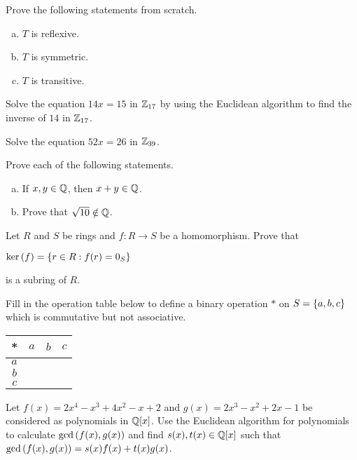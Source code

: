 \documentclass[11pt]{exam}
\begin{document}
\begin{questions}
Prove the following statements from scratch.
\begin{enumerate}[(a)]
\item $T$ is reflexive.
\vfill

\item $T$ is symmetric.
\vfill

\item $T$ is transitive.
\vfill

\end{enumerate}
\newpage

\question[3] Solve the equation $14x = 15$ in $\mathbb{Z}_{17}$ by using the Euclidean algorithm to find the inverse of $14$ in $\mathbb{Z}_{17}$.
\vfill

\question[3] Solve the equation $52x = 26$ in $\mathbb{Z}_{39}$.
\vfill

\newpage

\question[5] Prove each of the following statements.
\begin{enumerate}[(a)]
\item If $x,y\in\mathbb{Q}$, then $x+y\in\mathbb{Q}$.
\vfill

\item Prove that $\sqrt{10}\notin\mathbb{Q}$.
\vfill

\end{enumerate}
\newpage

\question[3] Let $R$ and $S$ be rings and $f:R\to S$ be a homomorphism.  Prove that
\begin{center}
$\text{ker}\left(f\right) = \left\{r\in R:f(r) = 0_{S}\right\}$
\end{center}
is a subring of $R$.
\vfill

\question[2] Fill in the operation table below to define a binary operation $*$ on $S = \left\{a,b,c\right\}$ which is commutative but not associative.
\bgroup
\begin{center}
\def\arraystretch{1.5}
\begin{tabular}{c|ccc}
* & $a$ & $b$ & $c$\\
\hline
$a$ &\\
$b$ &\\
$c$ &\\
\end{tabular}
\end{center}
\egroup

\newpage

\question[5] Let $f(x) = 2x^4 - x^3 + 4x^2 - x + 2$ and $g(x) = 2x^3 - x^2 + 2x - 1$ be considered as polynomials in $\mathbb{Q}[x]$.  Use the Euclidean algorithm for polynomials to calculate $\text{gcd}\left(f(x),g(x)\right)$ and find $s(x),t(x)\in\mathbb{Q}[x]$ such that $\text{gcd}\left(f(x),g(x)\right) = s(x)f(x) + t(x)g(x)$.
\newpage


\end{questions}
\end{document}
